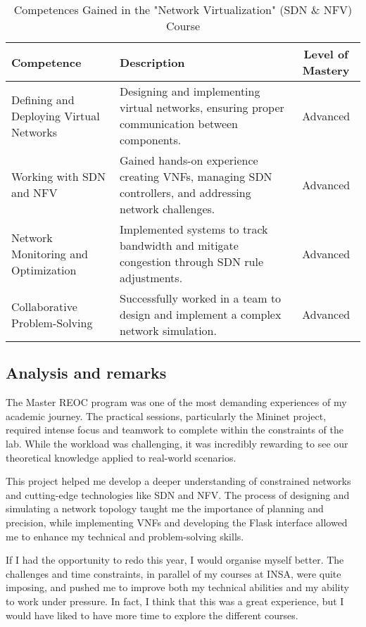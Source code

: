 \begin{table}[H]
    \centering
    \renewcommand{\arraystretch}{1.5} %
    \begin{tabular}{|p{3.5cm}|p{8cm}|c|}
    \hline
    \rowcolor[gray]{0.8}
    \textbf{Competence} & \textbf{Description} & \textbf{Level of Mastery} \\
    \hline
    Defining and Deploying Virtual Networks & Designing and implementing virtual networks, ensuring proper communication between components. & Advanced \\
    \hline
    Working with SDN and NFV & Gained hands-on experience creating VNFs, managing SDN controllers, and addressing network challenges. & Advanced \\
    \hline
    Network Monitoring and Optimization & Implemented systems to track bandwidth and mitigate congestion through SDN rule adjustments. & Advanced\\
    \hline
    Collaborative Problem-Solving & Successfully worked in a team to design and implement a complex network simulation. & Advanced\\
    \hline
    \end{tabular}
    \caption{Competences Gained in the "Network Virtualization" (SDN \& NFV) Course}
\end{table}

\subsection{Analysis and remarks}
\indent \indent The Master REOC program was one of the most demanding experiences of my academic journey.
The practical sessions, particularly the Mininet project, required intense focus and teamwork to complete within the constraints of the lab.
While the workload was challenging, it was incredibly rewarding to see our theoretical knowledge applied to real-world scenarios.
\vspace{0.25cm}

\noindent This project helped me develop a deeper understanding of constrained networks and cutting-edge technologies like SDN and NFV.
The process of designing and simulating a network topology taught me the importance of planning and precision, while implementing VNFs and developing the Flask interface allowed me to enhance my technical and problem-solving skills.
\vspace{0.25cm}

\noindent If I had the opportunity to redo this year, I would organise myself better.
The challenges and time constraints, in parallel of my courses at INSA, were quite imposing, and pushed me to improve both my technical abilities and my ability to work under pressure.
In fact, I think that this was a great experience, but I would have liked to have more time to explore the different courses.